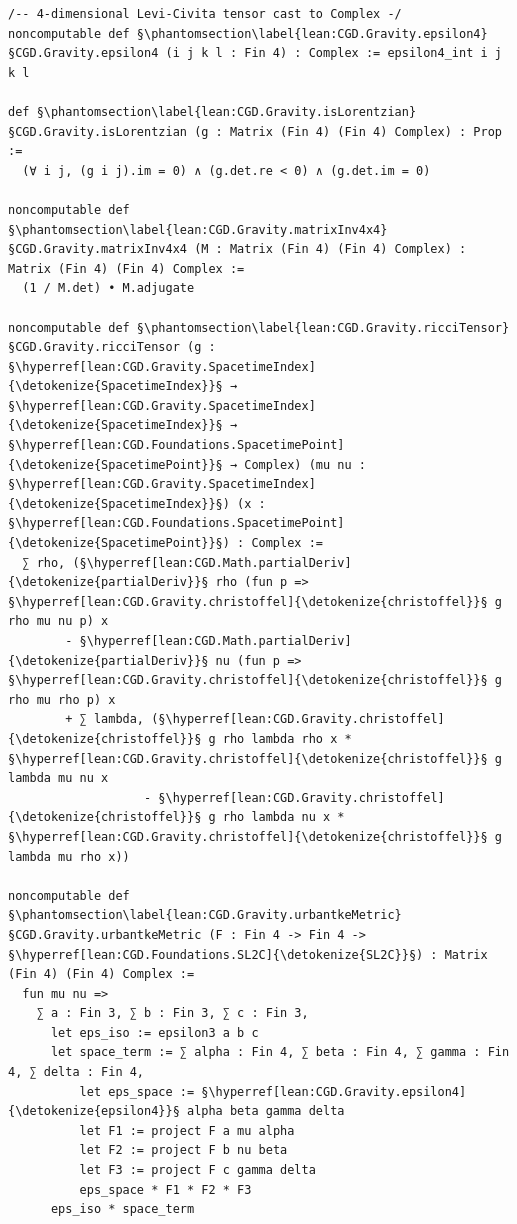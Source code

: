 \begin{verbatim}
/-- 4-dimensional Levi-Civita tensor cast to Complex -/
noncomputable def §\phantomsection\label{lean:CGD.Gravity.epsilon4}§CGD.Gravity.epsilon4 (i j k l : Fin 4) : Complex := epsilon4_int i j k l

def §\phantomsection\label{lean:CGD.Gravity.isLorentzian}§CGD.Gravity.isLorentzian (g : Matrix (Fin 4) (Fin 4) Complex) : Prop :=
  (∀ i j, (g i j).im = 0) ∧ (g.det.re < 0) ∧ (g.det.im = 0)

noncomputable def §\phantomsection\label{lean:CGD.Gravity.matrixInv4x4}§CGD.Gravity.matrixInv4x4 (M : Matrix (Fin 4) (Fin 4) Complex) : Matrix (Fin 4) (Fin 4) Complex :=
  (1 / M.det) • M.adjugate

noncomputable def §\phantomsection\label{lean:CGD.Gravity.ricciTensor}§CGD.Gravity.ricciTensor (g : §\hyperref[lean:CGD.Gravity.SpacetimeIndex]{\detokenize{SpacetimeIndex}}§ → §\hyperref[lean:CGD.Gravity.SpacetimeIndex]{\detokenize{SpacetimeIndex}}§ → §\hyperref[lean:CGD.Foundations.SpacetimePoint]{\detokenize{SpacetimePoint}}§ → Complex) (mu nu : §\hyperref[lean:CGD.Gravity.SpacetimeIndex]{\detokenize{SpacetimeIndex}}§) (x : §\hyperref[lean:CGD.Foundations.SpacetimePoint]{\detokenize{SpacetimePoint}}§) : Complex :=
  ∑ rho, (§\hyperref[lean:CGD.Math.partialDeriv]{\detokenize{partialDeriv}}§ rho (fun p => §\hyperref[lean:CGD.Gravity.christoffel]{\detokenize{christoffel}}§ g rho mu nu p) x
        - §\hyperref[lean:CGD.Math.partialDeriv]{\detokenize{partialDeriv}}§ nu (fun p => §\hyperref[lean:CGD.Gravity.christoffel]{\detokenize{christoffel}}§ g rho mu rho p) x
        + ∑ lambda, (§\hyperref[lean:CGD.Gravity.christoffel]{\detokenize{christoffel}}§ g rho lambda rho x * §\hyperref[lean:CGD.Gravity.christoffel]{\detokenize{christoffel}}§ g lambda mu nu x
                   - §\hyperref[lean:CGD.Gravity.christoffel]{\detokenize{christoffel}}§ g rho lambda nu x * §\hyperref[lean:CGD.Gravity.christoffel]{\detokenize{christoffel}}§ g lambda mu rho x))

noncomputable def §\phantomsection\label{lean:CGD.Gravity.urbantkeMetric}§CGD.Gravity.urbantkeMetric (F : Fin 4 -> Fin 4 -> §\hyperref[lean:CGD.Foundations.SL2C]{\detokenize{SL2C}}§) : Matrix (Fin 4) (Fin 4) Complex :=
  fun mu nu =>
    ∑ a : Fin 3, ∑ b : Fin 3, ∑ c : Fin 3,
      let eps_iso := epsilon3 a b c
      let space_term := ∑ alpha : Fin 4, ∑ beta : Fin 4, ∑ gamma : Fin 4, ∑ delta : Fin 4,
          let eps_space := §\hyperref[lean:CGD.Gravity.epsilon4]{\detokenize{epsilon4}}§ alpha beta gamma delta
          let F1 := project F a mu alpha
          let F2 := project F b nu beta
          let F3 := project F c gamma delta
          eps_space * F1 * F2 * F3
      eps_iso * space_term



\end{verbatim}
